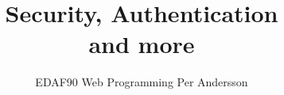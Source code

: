 \documentclass[aspectratio=1610]{beamer}
\title[Security, Authentication and more]{Security, Authentication \\and more}
\author[EDAF90]{%
  EDAF90 Web Programming\newline
  Per Andersson}
\begin{document}
\begin{frame}[plain]%
  \titlepage
\end{frame}





\begin{frame}[plain]
  \endpage
\end{frame}
\end{document}
